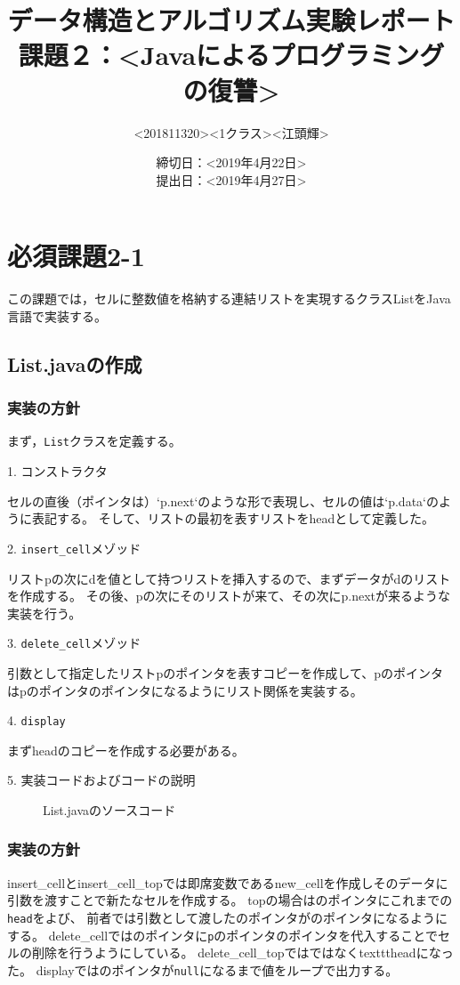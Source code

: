 \documentclass[10.5pt,a4paper]{jsarticle}
\title{データ構造とアルゴリズム実験レポート\\課題２：\textless Javaによるプログラミングの復讐\textgreater}
\author{\textless 201811320\textgreater \textless 1クラス\textgreater \textless 江頭輝\textgreater}
\date{締切日：\textless 2019年4月22日\textgreater\\提出日：\textless 2019年4月27日\textgreater}
\begin{document}
\maketitle

\section{必須課題2-1}

この課題では，セルに整数値を格納する連結リストを実現するクラスListをJava言語で実装する。

\subsection{List.javaの作成}
\subsubsection{実装の方針}

まず，\texttt{List}クラスを定義する。

1. コンストラクタ

セルの直後（ポインタは）`p.next`のような形で表現し、セルの値は`p.data`のように表記する。
そして、リストの最初を表すリストをheadとして定義した。

2. \texttt{insert\_cell}メゾッド

リストpの次にdを値として持つリストを挿入するので、まずデータがdのリストを作成する。
その後、pの次にそのリストが来て、その次にp.nextが来るような実装を行う。

3. \texttt{delete\_cell}メゾッド

引数として指定したリストpのポインタを表すコピーを作成して、pのポインタはpのポインタのポインタになるようにリスト関係を実装する。

4. \texttt{display}

まずheadのコピーを作成する必要がある。

5. 実装コードおよびコードの説明

\begin{figure}[t]
  \begin{center}
   
   \caption{List.javaのソースコード}
  \end{center}
\end{figure}

\subsubsection{実装の方針}
insert\_cellとinsert\_cell\_topでは即席変数であるnew\_cellを作成しそのデータに引数を渡すことで新たなセルを作成する。
topの場合はのポインタにこれまでの\texttt{head}をよび、
前者では引数として渡したのポインタがのポインタになるようにする。
delete\_cellではのポインタに\texttt{p}のポインタのポインタを代入することでセルの削除を行うようにしている。
delete\_cell\_topではではなくtexttt{head}になった。
displayではのポインタが\texttt{null}になるまで値をループで出力する。
\end{document}
